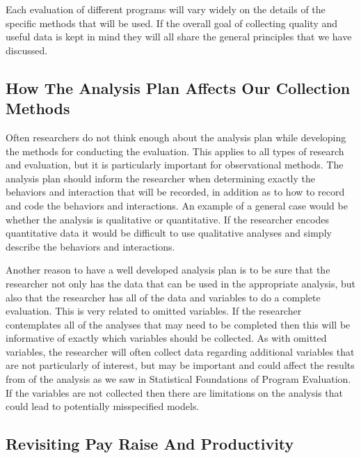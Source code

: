 \documentclass[]{book}
\theoremstyle{definition}
\theoremstyle{definition}
\theoremstyle{definition}
\theoremstyle{remark}
\begin{document}
Each evaluation of different programs will vary widely on the details of
the specific methods that will be used. If the overall goal of
collecting quality and useful data is kept in mind they will all share
the general principles that we have discussed.

\hypertarget{how-the-analysis-plan-affects-our-collection-methods}{%
\subsection{How The Analysis Plan Affects Our Collection
Methods}\label{how-the-analysis-plan-affects-our-collection-methods}}

Often researchers do not think enough about the analysis plan while
developing the methods for conducting the evaluation. This applies to
all types of research and evaluation, but it is particularly important
for observational methods. The analysis plan should inform the
researcher when determining exactly the behaviors and interaction that
will be recorded, in addition as to how to record and code the behaviors
and interactions. An example of a general case would be whether the
analysis is qualitative or quantitative. If the researcher encodes
quantitative data it would be difficult to use qualitative analyses and
simply describe the behaviors and interactions.

Another reason to have a well developed analysis plan is to be sure that
the researcher not only has the data that can be used in the appropriate
analysis, but also that the researcher has all of the data and variables
to do a complete evaluation. This is very related to omitted variables.
If the researcher contemplates all of the analyses that may need to be
completed then this will be informative of exactly which variables
should be collected. As with omitted variables, the researcher will
often collect data regarding additional variables that are not
particularly of interest, but may be important and could affect the
results from of the analysis as we saw in Statistical Foundations of
Program Evaluation. If the variables are not collected then there are
limitations on the analysis that could lead to potentially misspecified
models.

\hypertarget{revisiting-pay-raise-and-productivity}{%
\subsection{Revisiting Pay Raise And
Productivity}\label{revisiting-pay-raise-and-productivity}}
\end{document}
